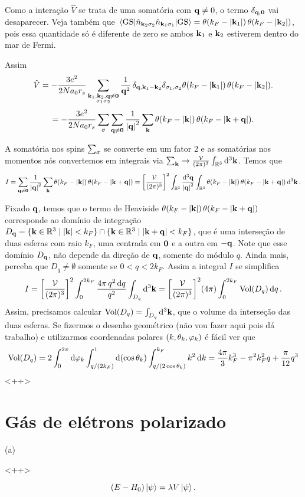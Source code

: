 \documentclass[a4paper,10pt]{article}
\begin{document}
Como a interação $\hat{V}$ se trata de uma somatória com $\vb{q} \neq 0$, o termo $\delta_{\vb{q}, \vb{0}}$ vai desaparecer. Veja também que $\ev{\nn_{\k_2 \s_2} \nn_{\k_1 \s_1}}{\text{GS}} = \theta(k_F - \abs{\k_1}) \, \theta(k_F - \abs{\k_2})$, pois essa quantidade só é diferente de zero se ambos $\vb{k}_1$ e $\vb{k}_2$ estiverem dentro do mar de Fermi.

Assim
$$
\hat{V} = - \frac{3e^2}{2N a_0 r_s} \sum_{\substack{\vb{k}_1, \vb{k}_2, \vb{q} \neq \vb{0} \\ \sigma_1 \sigma_2}} \frac{1}{\vb{q}^2} \,
\delta_{\vb{q}, \vb{k}_1 - \vb{k}_2} \delta_{\sigma_1, \sigma_2} \theta(k_F - \abs{\vb{k}_1}) \, \theta(k_F - \abs{\vb{k}_2}).
$$
$$
= - \frac{3e^2}{2N a_0 r_s} \sum_{\sigma} \sum_{\vb{q} \neq \vb{0}} \frac{1}{\abs{\vb{q}}^2} \sum_{\vb{k}}
\theta(k_F - \abs{\vb{k}}) \, \theta(k_F - \abs{\vb{k} + \vb{q}}).
$$

A somatória nos spins $\sum_{\sigma}$ se converte em um fator $2$ e as somatórias nos momentos nós convertemos em integrais via $\sum_{\vb{k}} \to \frac{\mathcal{V}}{(2\pi)^3} \int_{\mathbb{R}^3} \dd[3]{\vb{k}}$. Temos que
$$
I = \sum_{\vb{q} \neq \vb{0}} \frac{1}{\abs{\vb{q}}^2} \sum_{\vb{k}}
\theta(k_F - \abs{\vb{k}}) \, \theta(k_F - \abs{\vb{k} + \vb{q}}) =
\qty[ \frac{\mathcal{V}}{(2\pi)^3} ]^2 \int_{\mathbb{R}^3} \frac{\dd[3]{\vb{q}}}{\abs{\vb{q}}^2} \int_{\mathbb{R}^3}
\theta(k_F - \abs{\vb{k}}) \, \theta(k_F - \abs{\vb{k} + \vb{q}}) \dd[3]{\vb{k}}.
$$

Fixado $\vb{q}$, temos que o termo de Heaviside $\theta(k_F - \abs{\vb{k}}) \, \theta(k_F - \abs{\vb{k} + \vb{q}})$ corresponde ao domínio de integração $D_{\vb{q}} = \{\vb{k} \in \mathbb{R}^3 \mid \abs{\vb{k}} < k_F\} \cap \{\vb{k} \in \mathbb{R}^3 \mid \abs{\vb{k} + \vb{q}} < k_F\}$, que é uma interseção de duas esferas com raio $k_F$, uma centrada em $\vb{0}$ e a outra em $-\vb{q}$. Note que esse domínio $D_{\vb{q}}$, não depende da direção de $\vb{q}$, somente do módulo $q$. Ainda mais, perceba que $D_q \neq \emptyset$ somente se $0 < q < 2 k_F$. Assim a integral $I$ se simplifica
$$
I = \qty[\frac{\mathcal{V}}{(2\pi)^3}]^2 \int_0^{2k_F} \frac{4\pi \, q^2 \dd{q}}{q^2} \int_{D_q} \dd[3]{\vb{k}} =
\qty[\frac{\mathcal{V}}{(2\pi)^3}]^2 (4\pi) \int_0^{2k_F} \text{Vol}(D_q) \dd{q}.
$$
Assim, precisamos calcular $\text{Vol}(D_q) = \int_{D_q} \dd[3]{\vb{k}}$, que o volume da interseção das duas esferas. Se fizermos o desenho geométrico (não vou fazer aqui pois dá trabalho) e utilizarmos coordenadas polares $(k, \theta_k, \varphi_k)$ é fácil ver que
$$
\text{Vol}(D_q) = 2 \int_0^{2\pi} \dd{\varphi_k} \int_{q / (2 k_F)}^{1} \dd(\cos\theta_k) \int_{q / (2 \cos\theta_k)}^{k_F} k^2 \dd{k} = \frac{4\pi}{3} k_F^3 - \pi^2 k_F^2 q + \frac{\pi}{12} q^3
$$
<++>

\pagebreak

\section{Gás de elétrons polarizado}

(a)

<++>

\pagebreak

\begin{equation} \label{eq:pertub}
(E - H_0) \ket{\psi} = \lambda V \ket{\psi}.
\end{equation}
\end{document}
